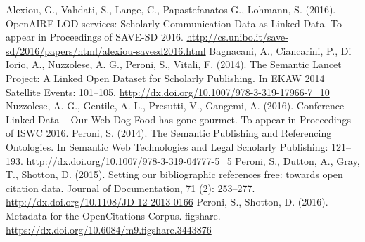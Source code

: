 \documentclass[runningheads,a4paper]{llncs}
\begin{document}
\begin{thebibliography}{4}

 Alexiou, G., Vahdati, S., Lange, C., Papastefanatos G., Lohmann, S. (2016). OpenAIRE LOD services: Scholarly Communication Data as Linked Data. To appear in Proceedings of SAVE-SD 2016. \url{http://cs.unibo.it/save-sd/2016/papers/html/alexiou-savesd2016.html}
 Bagnacani, A., Ciancarini, P., Di Iorio, A., Nuzzolese, A. G., Peroni, S., Vitali, F. (2014). The Semantic Lancet Project: A Linked Open Dataset for Scholarly Publishing. In EKAW 2014 Satellite Events: 101--105. \url{http://dx.doi.org/10.1007/978-3-319-17966-7\_10}
 Nuzzolese, A. G., Gentile, A. L., Presutti, V., Gangemi, A. (2016). Conference Linked Data -- Our Web Dog Food has gone gourmet. To appear in Proceedings of ISWC 2016.
 Peroni, S. (2014). The Semantic Publishing and Referencing Ontologies. In Semantic Web Technologies and Legal Scholarly Publishing: 121--193. \url{http://dx.doi.org/10.1007/978-3-319-04777-5_5}
 Peroni, S., Dutton, A., Gray, T., Shotton, D. (2015). Setting our bibliographic references free: towards open citation data. Journal of Documentation, 71 (2): 253--277. \url{http://dx.doi.org/10.1108/JD-12-2013-0166}
 Peroni, S., Shotton, D. (2016). Metadata for the OpenCitations Corpus. figshare. \url{https://dx.doi.org/10.6084/m9.figshare.3443876}

\end{thebibliography}
\end{document}

